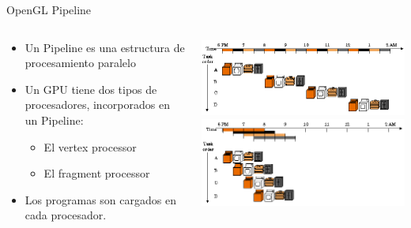 \documentclass[pdf,
serif,
compress,
xcolor=table,
dvipsnames,
spanish,
aspectratio=169]{beamer}
\begin{document}



\begin{frame}{OpenGL Pipeline}

\begin{columns}
\begin{column}{0.45\textwidth}
\begin{itemize}
\item Un Pipeline es una estructura de procesamiento paralelo
\item Un GPU tiene dos tipos de procesadores, incorporados en un Pipeline:
\begin{itemize}
\item El vertex processor
\item El fragment processor
\end{itemize}
\item Los programas son cargados en cada procesador.
\end{itemize}
\end{column}
\begin{column}{0.45\textwidth}
    \includegraphics[width=\textwidth]{FigsOpenGL/Pipeline1.png}\\
    \includegraphics[width=\textwidth]{FigsOpenGL/Pipeline2.png}    
\end{column}
\end{columns}

\end{frame}
\end{document}
